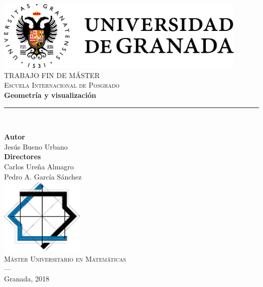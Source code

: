 \begin{titlepage}
 
 
\newlength{\centeroffset}
\setlength{\centeroffset}{-0.5\oddsidemargin}
\addtolength{\centeroffset}{0.5\evensidemargin}
\thispagestyle{empty}

\noindent\hspace*{\centeroffset}\begin{minipage}{\textwidth}

\centering
\includegraphics[width=0.9\textwidth]{images/logo_ugr.png}\\[1.4cm]

\textsc{ \Large TRABAJO FIN DE MÁSTER\\[0.2cm]}
\textsc{Escuela Internacional de Posgrado}\\[1cm]
% 
{\Huge\bfseries Geometría y visualización\\
}
\noindent\rule[-1ex]{\textwidth}{3pt}\\[3.5ex]
\end{minipage}

\vspace{2.5cm}
\noindent\hspace*{\centeroffset}\begin{minipage}{\textwidth}
\centering

\textbf{Autor}\\ {Jesús Bueno Urbano}\\[2.5ex]
\textbf{Directores}\\
{Carlos Ureña Almagro\\
Pedro A. García Sánchez}\\[2cm]
\includegraphics[width=0.3\textwidth]{images/mm.pdf}\\[0.1cm]
\textsc{Máster Universitario en Matemáticas}\\
\textsc{---}\\
Granada, 2018
\end{minipage}
\end{titlepage}


